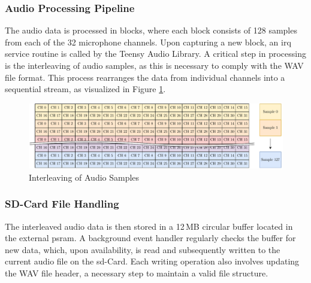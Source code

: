 \subsubsection{Audio Processing Pipeline}
The audio data is processed in blocks, where each block consists of 128 samples from each of the 32 microphone channels.
Upon capturing a new block, an \acrfull{irq} service routine is called by the Teensy Audio Library.
A critical step in processing is the interleaving of audio samples, as this is necessary to comply with the WAV file format.
This process rearranges the data from individual channels into a sequential stream, as visualized in Figure \ref{fig:audio_interleaving}.
\begin{figure}[h]
	\centering
	\includegraphics[width=1.0\textwidth]{images/4_design_acquisition_system/audio_interleaving.pdf}
	\caption{Interleaving of Audio Samples}
	\label{fig:audio_interleaving}
\end{figure}

\newpage
\subsubsection{SD-Card File Handling}
The interleaved audio data is then stored in a 12\,MB circular buffer located in the external \acrshort{psram}.
A background event handler regularly checks the buffer for new data, which, upon availability, is read and subsequently written to the current audio file on the \acrshort{sd}-Card.
Each writing operation also involves updating the WAV file header, a necessary step to maintain a valid file structure.

